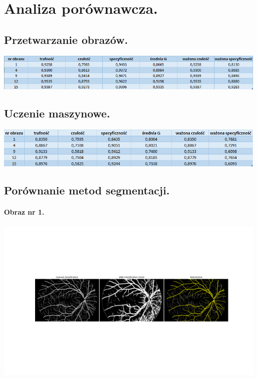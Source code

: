 \documentclass[a4paper, 11pt]{article}
\begin{document}
\section{Analiza porównawcza.}
\subsection{Przetwarzanie obrazów.}

\begin{center}
	
		\includegraphics[width=\textwidth]{./processing/data5.png}
		
\end{center}

\subsection{Uczenie maszynowe.}

\begin{center}
	
	\includegraphics[width=\textwidth]{./ML/data.png}
	
\end{center}

\subsection{Porównanie metod segmentacji.}

\paragraph{Obraz nr 1.}

\begin{center}
	
	\includegraphics[width=\textwidth]{./01_h.png}
	
\end{center}
\end{document}
